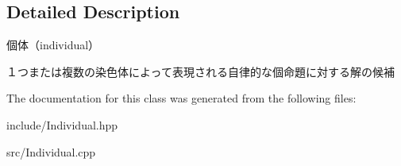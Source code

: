 \subsection{Detailed Description}
個体（individual） 

１つまたは複数の染色体によって表現される自律的な個命題に対する解の候補 

The documentation for this class was generated from the following files\+:\begin{DoxyCompactItemize}
\item 
include/Individual.\+hpp\item 
src/Individual.\+cpp\end{DoxyCompactItemize}

